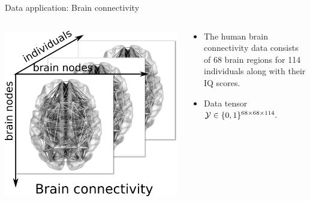 \documentclass[10pt, mathserif]{beamer} %
\theoremstyle{definition}
\theoremstyle{plain}
\begin{document}
\begin{frame}{Data application: Brain connectivity}
\begin{columns}
\begin{column}{0.21\textwidth}
   \begin{center}
     \includegraphics[width=\textwidth]{Figures/braindata.pdf}
     \end{center}
\end{column}
\begin{column}{0.7\textwidth} 
\begin{itemize}
    \item The human brain connectivity data consists of 68 brain regions for 114 individuals along with their IQ scores.
    \item  Data tensor $\mathcal{Y}\in\{0,1\}^{68\times68\times114}.$
\end{itemize}
\end{column}
\end{columns}


\end{frame}
\end{document}
